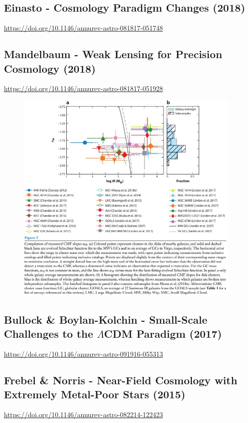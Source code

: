 \subsection*{Einasto - Cosmology Paradigm Changes (2018)}
\url{https://doi.org/10.1146/annurev-astro-081817-051748}


\subsection*{Mandelbaum - Weak Lensing for Precision Cosmology (2018)}
\url{https://doi.org/10.1146/annurev-astro-081817-051928}
\begin{figure}[H]
    \centering
    \includegraphics[width=.85 \textwidth]{Pictures/99/ei2018-4.jpg}
\end{figure}

\subsection*{Bullock \& Boylan-Kolchin - Small-Scale Challenges to the $\Lambda$CDM Paradigm (2017)}
\url{https://doi.org/10.1146/annurev-astro-091916-055313}

\subsection*{Frebel \& Norris - Near-Field Cosmology with Extremely Metal-Poor Stars (2015)}
\url{https://doi.org/10.1146/annurev-astro-082214-122423}




\newpage
